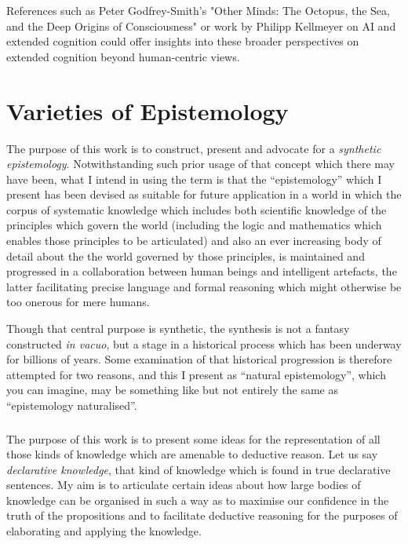 \documentclass[10pt,titlepage]{book}
\begin{document}
References such as Peter Godfrey-Smith's "Other Minds: The Octopus, the Sea, and the Deep Origins of Consciousness" or work by Philipp Kellmeyer on AI and extended cognition could offer insights into these broader perspectives on extended cognition beyond human-centric views.


\chapter{Varieties of Epistemology}


The purpose of this work is to construct, present and advocate for a \emph{synthetic epistemology}.
Notwithstanding such prior usage of that concept which there may have been, what I intend in using the term is that the ``epistemology'' which I present has been devised as suitable for future application in a world in which the corpus of systematic knowledge which includes both scientific knowledge of the principles which govern the world (including the logic and mathematics which enables those principles to be articulated) and also an ever increasing body of detail about the the world governed by those principles, is maintained and progressed in a collaboration between human beings and intelligent artefacts, the latter facilitating precise language and formal reasoning which might otherwise be too onerous for mere humans.

Though that central purpose is synthetic, the synthesis is not a fantasy constructed \emph{in vacuo}, but a stage in a historical process which has been underway for billions of years.
Some examination of that historical progression is therefore attempted for two reasons, and this I present as ``natural epistemology'', which you can imagine, may be something like but not entirely the same as ``epistemology naturalised''.

\subsection{}

The purpose of this work is to present some ideas for the representation of all those kinds of knowledge which are amenable to deductive reason.
Let us say \emph{declarative knowledge}, that kind of knowledge which is found in true declarative sentences.
My aim is to articulate certain ideas about how large bodies of knowledge can be organised in such a way as to maximise our confidence in the truth of the propositions and to facilitate deductive reasoning for the purposes of elaborating and applying the knowledge.
\end{document}
